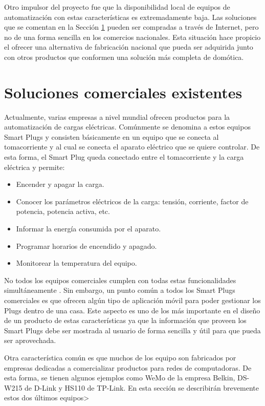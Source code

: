 Otro impulsor del proyecto fue que la disponibilidad local de equipos de automatización con estas características es extremadamente baja. Las soluciones que se comentan en la Sección \ref{section:soluciones_comerciales} pueden ser compradas a través de Internet, pero no de una forma sencilla en los comercios nacionales. Esta situación hace propicio el ofrecer una alternativa de fabricación nacional que pueda ser adquirida junto con otros productos que conformen una solución más completa de domótica.



\section{Soluciones comerciales existentes}
\label{section:soluciones_comerciales}

Actualmente, varias empresas a nivel mundial ofrecen productos para la automatización de cargas eléctricas. Comúnmente se denomina a estos equipos Smart Plugs y consisten básicamente en un equipo que se conecta al tomacorriente y al cual se conecta el aparato eléctrico que se quiere controlar. De esta forma, el Smart Plug queda conectado entre el tomacorriente y la carga eléctrica y permite:

\begin{itemize}
\item Encender y apagar la carga.
\item Conocer los parámetros eléctricos de la carga: tensión, corriente, factor de potencia, potencia activa, etc.
\item Informar la energía consumida por el aparato.
\item Programar horarios de encendido y apagado.
\item Monitorear la temperatura del equipo.
\end{itemize}

No todos los equipos comerciales cumplen con todas estas funcionalidades simultáneamente . Sin embargo, un punto común a todos los Smart Plugs comerciales es que ofrecen algún tipo de aplicación móvil para poder gestionar los Plugs dentro de una casa. Este aspecto es uno de los más importante en el diseño de un producto de estas características ya que la información que proveen los Smart Plugs debe ser mostrada al usuario de forma sencilla y útil para que pueda ser aprovechada.

Otra característica común es que muchos de los equipo son fabricados por empresas dedicadas a comercializar productos para redes de computadoras. De esta forma, se tienen algunos ejemplos como WeMo de la empresa Belkin, DS-W215 de D-Link y HS110 de TP-Link. En esta sección se describirán brevemente estos dos últimos equipos>


